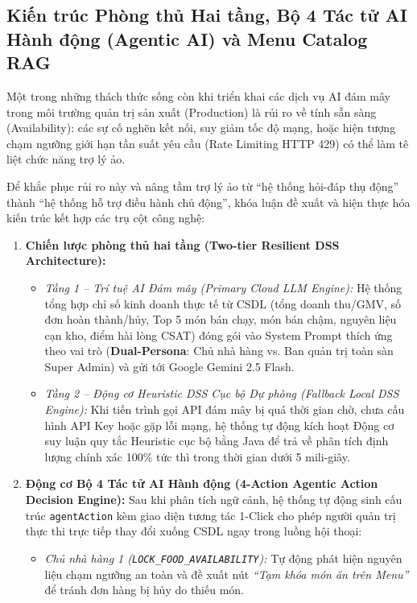 \documentclass{uetgraduation}
\begin{document}
\subsection{Kiến trúc Phòng thủ Hai tầng, Bộ 4 Tác tử AI Hành động (Agentic AI) và Menu Catalog RAG}
Một trong những thách thức sống còn khi triển khai các dịch vụ AI đám mây trong môi trường quản trị sản xuất (Production) là rủi ro về tính sẵn sàng (Availability): các sự cố nghẽn kết nối, suy giảm tốc độ mạng, hoặc hiện tượng chạm ngưỡng giới hạn tần suất yêu cầu (Rate Limiting HTTP 429) có thể làm tê liệt chức năng trợ lý ảo.

Để khắc phục rủi ro này và nâng tầm trợ lý ảo từ ``hệ thống hỏi-đáp thụ động'' thành ``hệ thống hỗ trợ điều hành chủ động'', khóa luận đề xuất và hiện thực hóa kiến trúc kết hợp các trụ cột công nghệ:
\begin{enumerate}
    \item \textbf{Chiến lược phòng thủ hai tầng (Two-tier Resilient DSS Architecture):}
    \begin{itemize}
        \item \textit{Tầng 1 -- Trí tuệ AI Đám mây (Primary Cloud LLM Engine):} Hệ thống tổng hợp chỉ số kinh doanh thực tế từ CSDL (tổng doanh thu/GMV, số đơn hoàn thành/hủy, Top 5 món bán chạy, món bán chậm, nguyên liệu cạn kho, điểm hài lòng CSAT) đóng gói vào System Prompt thích ứng theo vai trò (\textbf{Dual-Persona}: Chủ nhà hàng vs. Ban quản trị toàn sàn Super Admin) và gửi tới Google Gemini 2.5 Flash.
        \item \textit{Tầng 2 -- Động cơ Heuristic DSS Cục bộ Dự phòng (Fallback Local DSS Engine):} Khi tiến trình gọi API đám mây bị quá thời gian chờ, chưa cấu hình API Key hoặc gặp lỗi mạng, hệ thống tự động kích hoạt Động cơ suy luận quy tắc Heuristic cục bộ bằng Java để trả về phân tích định lượng chính xác 100\% tức thì trong thời gian dưới 5 mili-giây.
    \end{itemize}
    \item \textbf{Động cơ Bộ 4 Tác tử AI Hành động (4-Action Agentic Action Decision Engine):} Sau khi phân tích ngữ cảnh, hệ thống tự động sinh cấu trúc \texttt{agentAction} kèm giao diện tương tác 1-Click cho phép người quản trị thực thi trực tiếp thay đổi xuống CSDL ngay trong luồng hội thoại:
    \begin{itemize}
        \item \textit{Chủ nhà hàng 1 (\texttt{LOCK\_FOOD\_AVAILABILITY}):} Tự động phát hiện nguyên liệu chạm ngưỡng an toàn và đề xuất nút \textit{``Tạm khóa món ăn trên Menu''} để tránh đơn hàng bị hủy do thiếu món.

\end{itemize}
\end{enumerate}
\end{document}
